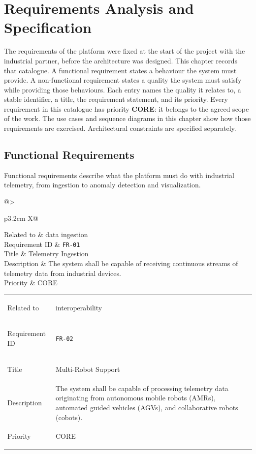 \chapter{Requirements Analysis and Specification}
\label{chap:requirements_analysis}

The requirements of the platform were fixed at the start of the project with the industrial partner, before the architecture was designed. This chapter records that catalogue. A functional requirement states a behaviour the system must provide. A non-functional requirement states a quality the system must satisfy while providing those behaviours. Each entry names the quality it relates to, a stable identifier, a title, the requirement statement, and its priority. Every requirement in this catalogue has priority \textbf{CORE}: it belongs to the agreed scope of the work. The use cases and sequence diagrams in this chapter show how those requirements are exercised. Architectural constraints are specified separately.

\newcommand{\reqtable}[5]{%
  \noindent
  \begin{tabularx}{\linewidth}{@{}>{\bfseries\raggedright\arraybackslash}p{3.2cm} X@{}}
    \toprule
    Related to & #1 \\
    Requirement ID & \texttt{#2} \\
    Title & #3 \\
    Description & #4 \\
    Priority & #5 \\
    \bottomrule
  \end{tabularx}%
  \par\vspace{0.9em}%
}

\section{Functional Requirements}
\label{sec:functional_requirements}

Functional requirements describe what the platform must do with industrial telemetry, from ingestion to anomaly detection and visualization.

\reqtable{data ingestion}{FR-01}{Telemetry Ingestion}{The system shall be capable of receiving continuous streams of telemetry data from industrial devices.}{CORE}

\reqtable{interoperability}{FR-02}{Multi-Robot Support}{The system shall be capable of processing telemetry data originating from autonomous mobile robots (AMRs), automated guided vehicles (AGVs), and collaborative robots (cobots).}{CORE}

